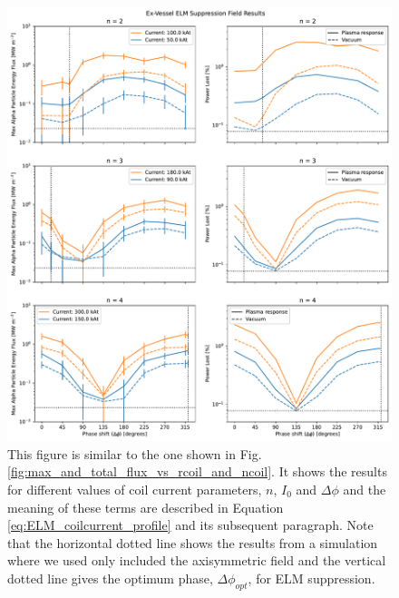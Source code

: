 \documentclass[10pt, a4paper, twoside]{article}
\begin{document}
\begin{figure}[!htb]
    \centering
    \includegraphics[width=0.99\linewidth]{Figures/max_and_total_flux_vs_phase_efcc.pdf}
    \caption{This figure is similar to the one shown in Fig. \ref{fig:max_and_total_flux_vs_rcoil_and_ncoil}. It shows the results for different values of coil current parameters, $n$, $I_0$ and $\Delta \phi$ and the meaning of these terms are described in Equation \eqref{eq:ELM_coilcurrent_profile} and its subsequent paragraph. Note that the horizontal dotted line shows the results from a simulation where we used only included the axisymmetric field and the vertical dotted line gives the optimum phase, $\Delta \phi_{opt}$, for ELM suppression.}
    \label{fig:max_and_total_flux_vs_phase_elm}
\end{figure}
\end{document}
